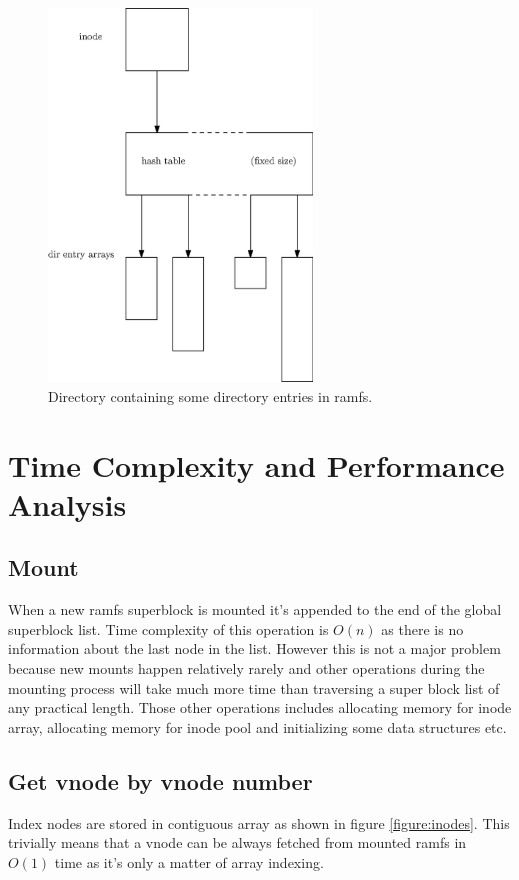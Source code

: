 \begin{figure}
  \center
  \includegraphics[width=7cm]{pics/dir}
  \caption{Directory containing some directory entries in ramfs.}
  \label{figure:dir}
\end{figure}


\section{Time Complexity and Performance Analysis}

\subsection{Mount}

When a new ramfs superblock is mounted it's appended to the end of the global
superblock list. Time complexity of this operation is $O(n)$ as there is no
information about the last node in the list. However this is not a major
problem because new mounts happen relatively rarely and other operations during
the mounting process will take much more time than traversing a super block list
of any practical length. Those other operations includes allocating memory for
inode array, allocating memory for inode pool and initializing some data
structures etc.

\subsection{Get vnode by vnode number}

Index nodes are stored in contiguous array as shown in figure
\ref{figure:inodes}. This trivially means that a vnode can be always fetched
from mounted ramfs in $O(1)$ time as it's only a matter of array indexing.

